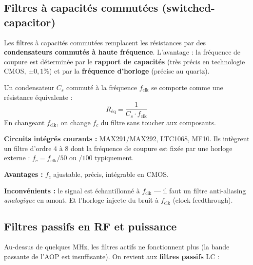 \documentclass[12pt,a4paper,twoside]{book}
\begin{document}
\subsection{Filtres à capacités commutées (switched-capacitor)}

Les filtres à capacités commutées remplacent les résistances par des \textbf{condensateurs commutés à haute fréquence}. L'avantage : la fréquence de coupure est déterminée par le \textbf{rapport de capacités} (très précis en technologie CMOS, $\pm 0{,}1\%$) et par la \textbf{fréquence d'horloge} (précise au quartz).

\begin{formule}
Un condensateur $C_s$ commuté à la fréquence $f_{\text{clk}}$ se comporte comme une résistance équivalente :
\[
R_{\text{éq}} = \frac{1}{C_s \cdot f_{\text{clk}}}
\]
En changeant $f_{\text{clk}}$, on change $f_c$ du filtre sans toucher aux composants.
\end{formule}

\begin{pratique}
\textbf{Circuits intégrés courants :} MAX291/MAX292, LTC1068, MF10. Ils intègrent un filtre d'ordre 4 à 8 dont la fréquence de coupure est fixée par une horloge externe : $f_c = f_{\text{clk}}/50$ ou $/100$ typiquement.

\textbf{Avantages :} $f_c$ ajustable, précis, intégrable en CMOS.

\textbf{Inconvénients :} le signal est échantillonné à $f_{\text{clk}}$ --- il faut un filtre anti-aliasing \textit{analogique} en amont. Et l'horloge injecte du bruit à $f_{\text{clk}}$ (clock feedthrough).
\end{pratique}

\subsection{Filtres passifs en RF et puissance}

Au-dessus de quelques MHz, les filtres actifs ne fonctionnent plus (la bande passante de l'AOP est insuffisante). On revient aux \textbf{filtres passifs} LC :
\end{document}

